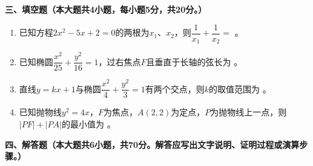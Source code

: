 \documentclass[12pt, a4paper]{ctexart}
\begin{document}
\vspace{0.5em}

\noindent\textbf{三、填空题（本大题共4小题，每小题5分，共20分。）}

\begin{enumerate}[label=\arabic*.]

\item 已知方程$2x^2-5x+2=0$的两根为$x_1$、$x_2$，则$\dfrac{1}{x_1}+\dfrac{1}{x_2}=$ \underline{\hspace{3cm}}。

\item 已知椭圆$\dfrac{x^2}{25}+\dfrac{y^2}{16}=1$，过右焦点$F$且垂直于长轴的弦长为 \underline{\hspace{3cm}}。

\item 直线$y=kx+1$与椭圆$\dfrac{x^2}{4}+\dfrac{y^2}{3}=1$有两个交点，则$k$的取值范围为 \underline{\hspace{3cm}}。

\item 已知抛物线$y^2=4x$，$F$为焦点，$A(2,2)$为定点，$P$为抛物线上一点，则$|PF|+|PA|$的最小值为 \underline{\hspace{3cm}}。

\end{enumerate}

\vspace{0.5em}

\noindent\textbf{四、解答题（本大题共6小题，共70分。解答应写出文字说明、证明过程或演算步骤。）}
\end{document}

